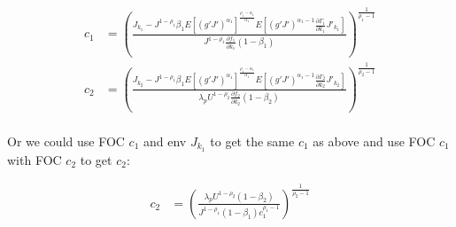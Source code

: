 \documentclass[10pt]{article}
\newcommand{\fracpd}[2]{
  \ensuremath{\frac{\partial #1}{\partial #2}}
}
\begin{document}
\begin{align*}
  c_1 &= \left( \frac{J_{k_1} - J^{1-\rho_1} \beta_1 E\left[(g'J')^{\alpha_1} \right]^{\frac{\rho_1 - \alpha_1}{\alpha_1}} E \left[ (g'J')^{\alpha_1 - 1} \fracpd{\Gamma_1}{k_1} J'_{k_1} \right]}{J^{1-\rho_1} \fracpd{f_1}{k_1} (1 - \beta_1)} \right)^{\frac{1}{\rho_1 - 1}} \\
   c_2 &= \left( \frac{J_{k_2} - J^{1-\rho_1} \beta_1 E\left[(g'J')^{\alpha_1} \right]^{\frac{\rho_1 - \alpha_1}{\alpha_1}} E \left[ (g'J')^{\alpha_1 - 1} \fracpd{\Gamma_2}{k_2} J'_{k_2} \right]}{\lambda_p  U^{1-\rho_2} \fracpd{f_2}{k_2} (1 - \beta_2)} \right)^{\frac{1}{\rho_2 - 1}} \\
\end{align*}


Or we could use FOC $c_1$ and env $J_{k_1}$ to get the same $c_1$ as above and
use FOC $c_1$ with FOC $c_2$ to get $c_2$:

\begin{align*}
  c_2 &= \left( \frac{\lambda_p U^{1-\rho_2}(1 - \beta_2)}{J^{1-\rho_1} (1 - \beta_1)c_1^{\rho_1 - 1}} \right)^{\frac{1}{\rho_2-1}}
\end{align*}
\end{document}
